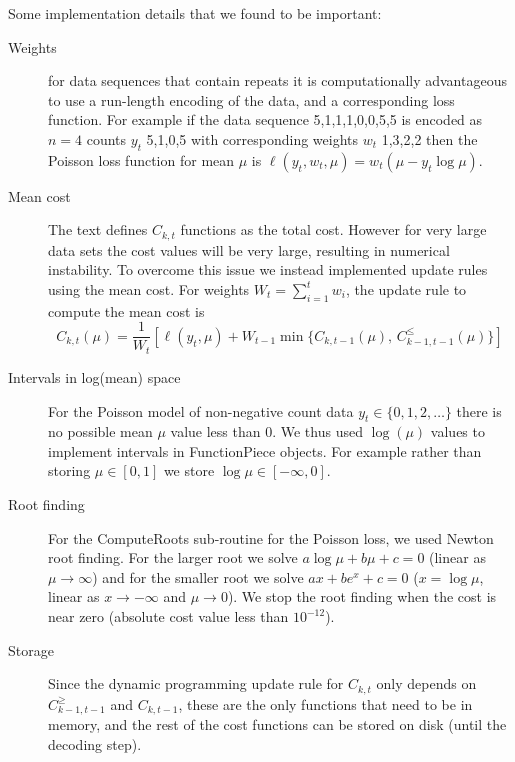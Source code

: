 \documentclass{article}
\begin{document}
Some implementation details that we found to be important:
\begin{description}
\item[Weights] for data sequences that contain repeats it is
  computationally advantageous to use a run-length encoding of the
  data, and a corresponding loss function. For example if the data
  sequence 5,1,1,1,0,0,5,5 is encoded as $n=4$ counts $y_t$ 5,1,0,5 with
  corresponding weights $w_t$ 1,3,2,2 then the Poisson loss function
  for mean $\mu$ is $\ell(y_t, w_t, \mu) = w_t(\mu- y_t\log \mu)$.
\item[Mean cost] The text defines $C_{k,t}$ functions as the total
  cost. However for very large data sets the cost values will be very
  large, resulting in numerical instability. To overcome this issue we
  instead implemented update rules using the mean cost.  For weights
  $W_{t}=\sum_{i=1}^t w_i$, the update rule to compute the mean cost is
$$  C_{k,t}(\mu) = \frac{1}{W_{t}} \left[\ell(y_t, \mu) + 
W_{t-1}
\min\{ C_{k,t-1}(\mu),\, C_{k-1,t-1}^\leq(\mu)  \}\right]$$
\item[Intervals in log(mean) space] For the Poisson model of
  non-negative count data $y_t\in\{0,1,2,\dots\}$ there is no possible
  mean $\mu$ value less than 0. We thus used $\log(\mu)$ values to
  implement intervals in FunctionPiece objects. For example rather
  than storing $\mu\in[0,1]$ we store $\log\mu\in[-\infty, 0]$.
\item[Root finding] For the ComputeRoots sub-routine for the Poisson
  loss, we used Newton root finding. For the larger root we solve
  $a\log\mu + b\mu + c = 0$ (linear as $\mu\rightarrow\infty$) and for
  the smaller root we solve $a x + be^x + c = 0$ ($x=\log \mu$, linear
  as $x\rightarrow -\infty$ and $\mu\rightarrow 0$). We stop the root
  finding when the cost is near zero (absolute cost value less
  than $10^{-12}$).
\item[Storage] Since the dynamic programming update rule for $C_{k,t}$
  only depends on $C_{k-1,t-1}^\geq$ and $C_{k,t-1}$, these are the
  only functions that need to be in memory, and the rest of the cost
  functions can be stored on disk (until the decoding step). 
\end{description}

% 
% 
\end{document}
